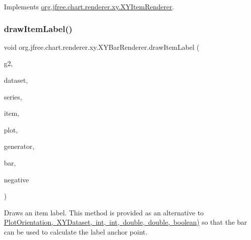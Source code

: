 Implements \mbox{\hyperlink{interfaceorg_1_1jfree_1_1chart_1_1renderer_1_1xy_1_1_x_y_item_renderer_ad867040a3ea09f5127596aacdd94586a}{org.\+jfree.\+chart.\+renderer.\+xy.\+X\+Y\+Item\+Renderer}}.

\mbox{\label{classorg_1_1jfree_1_1chart_1_1renderer_1_1xy_1_1_x_y_bar_renderer_a8a263b5b7875308d41ef8597069a0fb0}} 
\subsubsection{\texorpdfstring{draw\+Item\+Label()}{drawItemLabel()}}
{\footnotesize\ttfamily void org.\+jfree.\+chart.\+renderer.\+xy.\+X\+Y\+Bar\+Renderer.\+draw\+Item\+Label (\begin{DoxyParamCaption}\item[{Graphics2D}]{g2,  }\item[{\mbox{\hyperlink{interfaceorg_1_1jfree_1_1data_1_1xy_1_1_x_y_dataset}{X\+Y\+Dataset}}}]{dataset,  }\item[{int}]{series,  }\item[{int}]{item,  }\item[{\mbox{\hyperlink{classorg_1_1jfree_1_1chart_1_1plot_1_1_x_y_plot}{X\+Y\+Plot}}}]{plot,  }\item[{\mbox{\hyperlink{interfaceorg_1_1jfree_1_1chart_1_1labels_1_1_x_y_item_label_generator}{X\+Y\+Item\+Label\+Generator}}}]{generator,  }\item[{Rectangle2D}]{bar,  }\item[{boolean}]{negative }\end{DoxyParamCaption})\hspace{0.3cm}{\ttfamily [protected]}}

Draws an item label. This method is provided as an alternative to \mbox{\hyperlink{}{Plot\+Orientation, X\+Y\+Dataset, int, int, double, double, boolean)}} so that the bar can be used to calculate the label anchor point.



